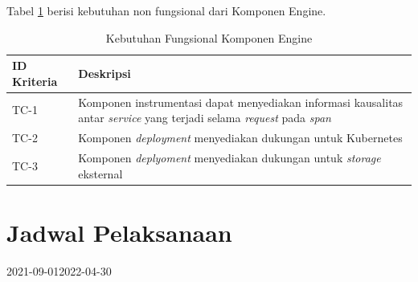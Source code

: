 Tabel \ref{ch3-nonfunc-engine} berisi kebutuhan non fungsional dari Komponen Engine.

\begin{small}
	\begin{longtable}{ | p{3cm} | p{10cm} |}
		\caption{Kebutuhan Fungsional Komponen Engine}
		\label{ch3-nonfunc-engine}                                                           
		\\ \hline
		\centering\bfseries{ID Kriteria} & \centering\bfseries{Deskripsi} \tabularnewline \hline
		\endfirsthead
		TC-1 & Komponen instrumentasi dapat menyediakan informasi kausalitas antar \textit{service} yang terjadi selama \textit{request} pada \textit{span} \\ \hline
		TC-2 & Komponen \textit{deployment} menyediakan dukungan untuk Kubernetes \\ \hline
		TC-3 & Komponen \textit{deplyoment} menyediakan dukungan untuk \textit{storage} eksternal \\ \hline
	\end{longtable}
\end{small}

\section{Jadwal Pelaksanaan}
 
 \newsavebox\mybox
 \begin{lrbox}{\mybox}
	     \begin{ganttchart}[
		     vgrid={*{6}{draw=none}, dotted},
		     x unit=.05cm,
		     y unit title=.6cm,
		     y unit chart=.6cm,
		     time slot format=isodate,
		     time slot format/start date=2016-09-01]{2021-09-01}{2022-04-30}
		      \\
		     \\
		     \\
		     \\
		     \\
		     \end{ganttchart}
	 \end{lrbox}

